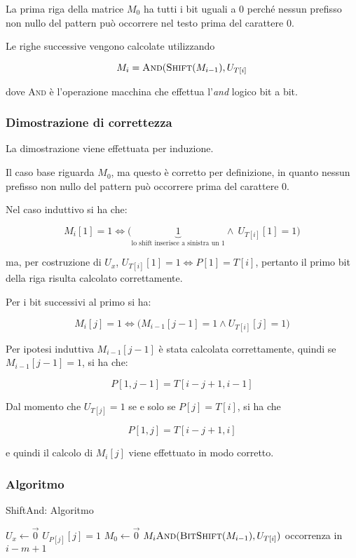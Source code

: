 La prima riga della matrice $M_0$ ha tutti i bit uguali a 0 perché
nessun prefisso non nullo del pattern può occorrere nel testo prima del
carattere 0.

Le righe successive vengono calcolate utilizzando

$$M_i = \textsc{And}(\textsc{Shift}(M_{i-1}), U_{T[i]}$$

dove \textsc{And} è l'operazione macchina che effettua l'\textit{and} logico bit
a bit.

\subsubsection{Dimostrazione di correttezza}\label{dimostrazione-di-correttezza}

La dimostrazione viene effettuata per induzione.

Il caso base riguarda $M_0$, ma questo è corretto per definizione, in quanto nessun prefisso non nullo del pattern può occorrere prima del carattere 0.

Nel caso induttivo si ha che:

$$M_i{[1]} = 1 \Leftrightarrow \big( \underbrace{1}_{\text{lo shift inserisce a sinistra un 1}} \wedge\: U_{T[i]}[1] = 1  \big)$$

ma, per costruzione di $ U_x $, $U_{T[i]}[1] = 1 \Leftrightarrow P[1] = T[i] $, pertanto il primo bit della riga risulta calcolato correttamente. 

Per i bit successivi al primo si ha:

$$
M_i[j] = 1 \Leftrightarrow \big( M_{i-1}[j-1] = 1 \wedge U_{T[i]}[j] = 1 \big)
$$

Per ipotesi induttiva $M_{i-1}[j-1]$ è stata calcolata correttamente, quindi se $M_{i-1}[j-1] = 1$, si ha che:

$$
P[1, j-1] = T[i -j +1, i-1]
$$

Dal momento che $U_{T[j]} = 1$ se e solo se $P[j] =T[i]$, si ha che

$$
P[1,j] = T[i-j+1,i]
$$

e quindi il calcolo di $M_{i}[j]$ viene effettuato in modo
corretto.

\subsubsection{Algoritmo}\label{algoritmo}

\begin{breakablealgorithm}
	\caption{ShiftAnd: Algoritmo }
	\begin{algorithmic}[1]
        \State $ U_x \gets \vec{0} $
    \EndFor
        \State $U_{P[j]}[j] =1$
    \EndFor
    \State $M_0 \gets \vec{0}$
        \State $M_i \text{\textsc{And}}(\text{\textsc{BitShift}}(M_{i-1}), U_{T[i]})$
            \State occorrenza in $i -m +1$
        \EndIf
    \EndFor
\EndFunction
\end{algorithmic}
\end{breakablealgorithm}

